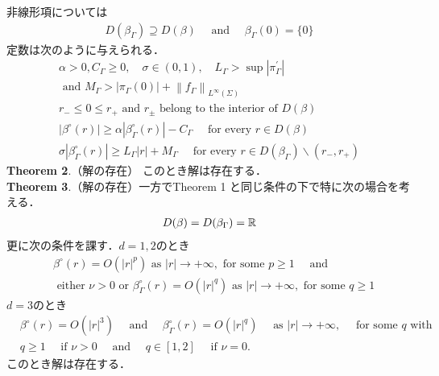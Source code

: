\documentclass[openary, a4paper, oneside]{jsarticle}
\begin{document}
	非線形項については
	\begin{align}
		D\left(\beta_{\Gamma}\right) \supseteq D(\beta) \quad \text { and } \quad \beta_{\Gamma}(0)=\{0\}
	\end{align}
	定数は次のように与えられる．
	\begin{align}
		\alpha>0, C_{\Gamma} \geq 0, \quad \sigma \in(0,1), \quad L_{\Gamma}>\sup \left|\pi_{\Gamma}^{\prime}\right| \\
		\text { and } M_{\Gamma}>\left|\pi_{\Gamma}(0)\right|+\left\|f_{\Gamma}\right\|_{L^{\infty}(\Sigma)}\\
		r_{-} \leq 0 \leq r_{+}\text{ and }r_{\pm}\text{ belong to the interior of }D(\beta)\\
		\left|\beta^{\circ}(r)\right| \geq \alpha\left|\beta_{\Gamma}^{\circ}(r)\right|-C_{\Gamma} \quad \text { for every } r \in D(\beta) \\
		\sigma\left|\beta_{\Gamma}^{\circ}(r)\right| \geq L_{\Gamma}|r|+M_{\Gamma} \quad \text { for every } r \in D\left(\beta_{\Gamma}\right) \backslash\left(r_{-}, r_{+}\right)			
	\end{align}
	{\bf Theorem 2}.（解の存在）
	このとき解は存在する．\\
	{\bf Theorem 3}.（解の存在）一方でTheorem 1 と同じ条件の下で特に次の場合を考える．
	\begin{align}
		D(\beta) = D(\beta_{\Gamma}) = \mathbb{R}
	\end{align}
	更に次の条件を課す．$d=1,2$のとき
	\begin{equation}\begin{aligned}
		&\beta^{\circ}(r)=O\left(|r|^{p}\right) \text { as }|r| \rightarrow+\infty, \text { for some } p \geq 1 \quad \text { and }\\
		&\text { either } \nu>0 \text { or } \beta_{\Gamma}^{\circ}(r)=O\left(|r|^{q}\right) \text { as }|r| \rightarrow+\infty, \text { for some } q \geq 1
	\end{aligned}\end{equation}	
	$d=3$のとき
	\begin{equation}\begin{aligned}
		&\beta^{\circ}(r)=O\left(|r|^{3}\right) \quad \text { and } \quad \beta_{\Gamma}^{\circ}(r)=O\left(|r|^{q}\right) \quad \text { as }|r| \rightarrow+\infty, \quad \text { for some } q \text { with }\\
		&q \geq 1 \quad \text { if } \nu>0 \quad \text { and } \quad q \in[1,2] \quad \text { if } \nu=0.
	\end{aligned}\end{equation}
	このとき解は存在する．
\end{document}
